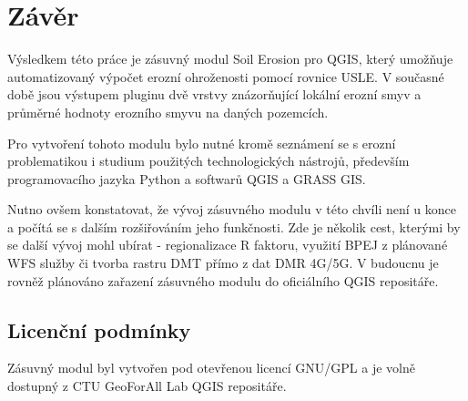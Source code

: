 \chapter{Závěr}


Výsledkem této práce je zásuvný modul Soil Erosion pro QGIS, který
umožňuje automatizovaný výpočet erozní ohroženosti pomocí rovnice
USLE. V současné době jsou výstupem pluginu dvě vrstvy znázorňující
lokální erozní smyv a průměrné hodnoty erozního smyvu na daných
pozemcích.

Pro vytvoření tohoto modulu bylo nutné kromě seznámení se s erozní
problematikou i studium použitých technologických nástrojů, především
programovacího jazyka Python a softwarů QGIS a GRASS GIS.

Nutno ovšem konstatovat, že vývoj zásuvného modulu v této chvíli není
u konce a počítá se s dalším rozšiřováním jeho funkčnosti. Zde je
několik cest, kterými by se další vývoj mohl ubírat - regionalizace R
faktoru, využití BPEJ z plánované WFS služby či tvorba rastru DMT
přímo z dat DMR 4G/5G. V budoucnu je rovněž plánováno zařazení
zásuvného modulu do oficiálního QGIS repositáře.

\section{Licenční podmínky}

Zásuvný modul byl vytvořen pod otevřenou licencí GNU/GPL a je volně
dostupný z CTU GeoForAll Lab QGIS repositáře.

